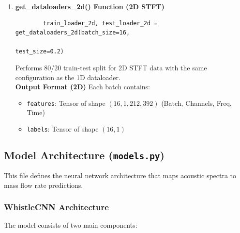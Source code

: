 \begin{enumerate}
    \textbf{Output Format (1D)}
    Each batch contains:
    \begin{itemize}
        \item \verb|features|: Tensor of shape $(16, 1, 1698)$
        \item \verb|labels|: Tensor of shape $(16, 1)$
    \end{itemize}

    \item \textbf{get\_dataloaders\_2d() Function (2D STFT)} \\
    \begin{verbatim}
        train_loader_2d, test_loader_2d = get_dataloaders_2d(batch_size=16, 
                                                            test_size=0.2)
    \end{verbatim}

    Performs 80/20 train-test split for 2D STFT data with the same configuration as the 1D dataloader. \\

    \textbf{Output Format (2D)}
    Each batch contains:
    \begin{itemize}
        \item \verb|features|: Tensor of shape $(16, 1, 212, 392)$ (Batch, Channels, Freq, Time)
        \item \verb|labels|: Tensor of shape $(16, 1)$
    \end{itemize}
\end{enumerate}

\subsection{Model Architecture (\texttt{models.py})}

This file defines the neural network architecture that maps acoustic spectra 
to mass flow rate predictions.

\subsubsection{WhistleCNN Architecture}
The model consists of two main components:

